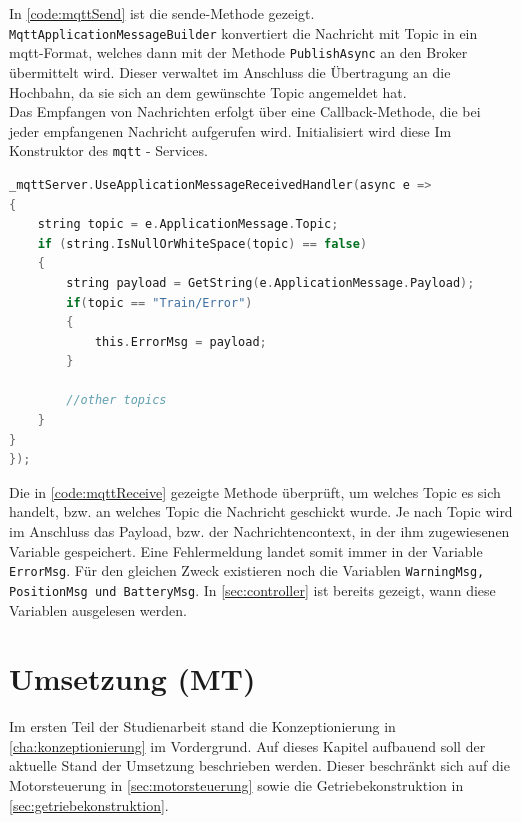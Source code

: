 \vspace{0.5cm}
In \autoref{code:mqttSend} ist die sende-Methode gezeigt. \texttt{MqttApplicationMessageBuilder} konvertiert die Nachricht mit Topic in ein \acrshort{mqtt}-Format, welches dann mit der Methode \texttt{PublishAsync} an den Broker übermittelt wird. Dieser verwaltet im Anschluss die Übertragung an die Hochbahn, da sie sich an dem gewünschte Topic angemeldet hat.\\
Das Empfangen von Nachrichten erfolgt über eine Callback-Methode, die bei jeder empfangenen Nachricht aufgerufen wird. Initialisiert wird diese Im Konstruktor des \texttt{mqtt} - Services.

\begin{lstlisting}[language=c, style=dhpaperdefault]
_mqttServer.UseApplicationMessageReceivedHandler(async e =>
{
	string topic = e.ApplicationMessage.Topic;
	if (string.IsNullOrWhiteSpace(topic) == false)
	{
		string payload = GetString(e.ApplicationMessage.Payload);
		if(topic == "Train/Error")
		{
			this.ErrorMsg = payload;
		}
		
		//other topics
	}
}
});

\end{lstlisting}
\vspace{0.5cm}

Die in \autoref{code:mqttReceive} gezeigte Methode überprüft, um welches Topic es sich handelt, bzw. an welches Topic die Nachricht geschickt wurde. Je nach Topic wird im Anschluss das Payload, bzw. der Nachrichtencontext, in der ihm zugewiesenen Variable gespeichert. Eine Fehlermeldung landet somit immer in der Variable \texttt{ErrorMsg}. Für den gleichen Zweck existieren noch die Variablen \texttt{WarningMsg, PositionMsg und BatteryMsg}. In \autoref{sec:controller} ist bereits gezeigt, wann diese Variablen ausgelesen werden. 

\chapter{Umsetzung (MT)} 
\label{cha:umsetzung}
Im ersten Teil der Studienarbeit stand die Konzeptionierung in \autoref{cha:konzeptionierung} im Vordergrund. Auf dieses Kapitel aufbauend soll der aktuelle Stand der Umsetzung beschrieben werden. Dieser beschränkt sich  auf die Motorsteuerung in \autoref{sec:motorsteuerung} sowie die Getriebekonstruktion in \autoref{sec:getriebekonstruktion}.
\newpage
 
